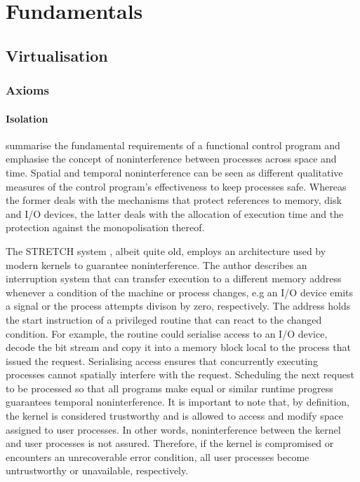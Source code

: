 \chapter{Fundamentals}
\section{Virtualisation}
\subsection{Axioms}
\subsubsection{Isolation}
\textcite{10.1145/368481.368502} summarise the fundamental
requirements of a functional control program and emphasise the concept of noninterference between 
processes across space and time. Spatial and temporal noninterference can be seen as different 
qualitative measures of the control program's effectiveness to keep processes safe. Whereas the 
former deals with the mechanisms that protect references to memory, disk and I/O devices, the latter
deals with the allocation of execution time and the protection against the monopolisation thereof.

The STRETCH system \cite{10.1145/368481.368502}, albeit quite old, employs an architecture used by 
modern kernels to guarantee noninterference. The author describes an interruption system that can 
transfer execution to a different memory address whenever a condition of the machine or process 
changes, e.g an I/O device emits a signal or the process attempts divison by zero, respectively.
The address holds the start instruction of a privileged routine that can react to the changed 
condition. For example, the routine could serialise access to an I/O device, decode the bit stream 
and copy it into a memory block local to the process that issued the request. Serialising access 
ensures that concurrently executing processes cannot spatially interfere with the request. Scheduling
the next request to be processed so that all programs make equal or similar runtime progress guarantees 
temporal noninterference. It is important to note that, by definition, the kernel is considered 
trustworthy and is allowed to access and modify space assigned to user processes. In other words, 
noninterference between the kernel and user processes is not assured. Therefore, if the kernel is
compromised or encounters an unrecoverable error condition, all user processes become untrustworthy 
or unavailable, respectively.

